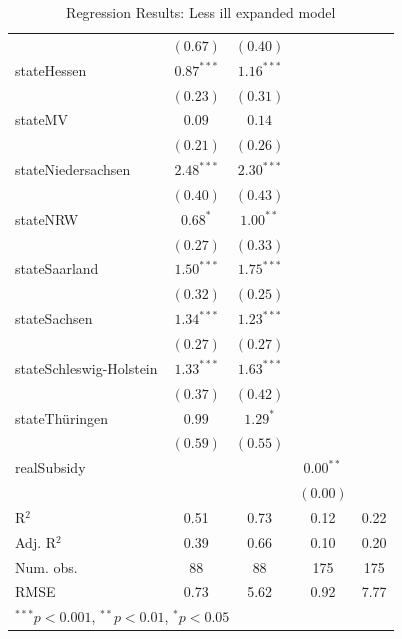 \documentclass[12pt, a4paper, titlepage]{article}\usepackage[]{graphicx}\usepackage[]{color}
\begin{document}
\begin{table}
\begin{center}
{\begin{tabular}{l c c c c }
                          & $(0.67)$      & $(0.40)$     &             &            \\
stateHessen               & $0.87^{***}$  & $1.16^{***}$ &             &            \\
                          & $(0.23)$      & $(0.31)$     &             &            \\
stateMV                   & $0.09$        & $0.14$       &             &            \\
                          & $(0.21)$      & $(0.26)$     &             &            \\
stateNiedersachsen        & $2.48^{***}$  & $2.30^{***}$ &             &            \\
                          & $(0.40)$      & $(0.43)$     &             &            \\
stateNRW                  & $0.68^{*}$    & $1.00^{**}$  &             &            \\
                          & $(0.27)$      & $(0.33)$     &             &            \\
stateSaarland             & $1.50^{***}$  & $1.75^{***}$ &             &            \\
                          & $(0.32)$      & $(0.25)$     &             &            \\
stateSachsen              & $1.34^{***}$  & $1.23^{***}$ &             &            \\
                          & $(0.27)$      & $(0.27)$     &             &            \\
stateSchleswig-Holstein   & $1.33^{***}$  & $1.63^{***}$ &             &            \\
                          & $(0.37)$      & $(0.42)$     &             &            \\
stateThüringen            & $0.99$        & $1.29^{*}$   &             &            \\
                          & $(0.59)$      & $(0.55)$     &             &            \\
realSubsidy               &               &              & $0.00^{**}$ &            \\
                          &               &              & $(0.00)$    &            \\
\hline
R$^2$                     & 0.51          & 0.73         & 0.12        & 0.22       \\
Adj. R$^2$                & 0.39          & 0.66         & 0.10        & 0.20       \\
Num. obs.                 & 88            & 88           & 175         & 175        \\
RMSE                      & 0.73          & 5.62         & 0.92        & 7.77       \\
\hline
\multicolumn{5}{l}{\scriptsize{$^{***}p<0.001$, $^{**}p<0.01$, $^*p<0.05$}}
\end{tabular}
}
\caption{Regression Results: Less ill expanded model}
\label{expandLessIll}
\end{center}
\end{table}
\end{document}
